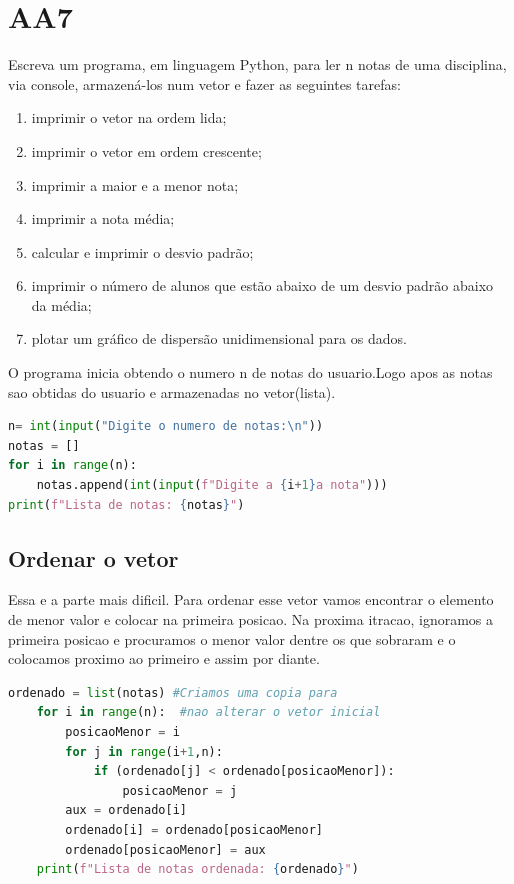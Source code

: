 \documentclass{article}
\begin{document}
\section{AA7}

Escreva um programa, em linguagem Python, para ler n notas de uma disciplina, via console, armazená-los num vetor e fazer as seguintes tarefas:
\begin{enumerate}
    \item imprimir o vetor na ordem lida;
    \item imprimir o vetor em ordem crescente;
    \item imprimir a maior e a menor nota;
    \item imprimir a nota média;
    \item calcular e imprimir o desvio padrão;
    \item imprimir o número de alunos que estão abaixo de um desvio padrão abaixo da média;
    \item plotar um gráfico de dispersão unidimensional para os dados.
    
\end{enumerate}

O programa inicia obtendo o numero n de notas do usuario.Logo apos as notas sao obtidas do usuario e armazenadas no vetor(lista). 
\begin{lstlisting}[language=python]
n= int(input("Digite o numero de notas:\n"))
notas = []
for i in range(n):
    notas.append(int(input(f"Digite a {i+1}a nota")))
print(f"Lista de notas: {notas}")
\end{lstlisting}

\subsection{Ordenar o vetor}
Essa e a parte mais dificil. Para ordenar esse vetor vamos encontrar o elemento de menor valor e colocar na primeira posicao. Na proxima itracao, ignoramos a primeira posicao e procuramos o menor valor dentre os que sobraram e o colocamos proximo ao primeiro e assim por diante. 

\begin{lstlisting}[language=Python]
 ordenado = list(notas) #Criamos uma copia para
    for i in range(n):  #nao alterar o vetor inicial
        posicaoMenor = i
        for j in range(i+1,n):
            if (ordenado[j] < ordenado[posicaoMenor]):
                posicaoMenor = j
        aux = ordenado[i]
        ordenado[i] = ordenado[posicaoMenor]
        ordenado[posicaoMenor] = aux
    print(f"Lista de notas ordenada: {ordenado}")
\end{lstlisting}
\end{document}
